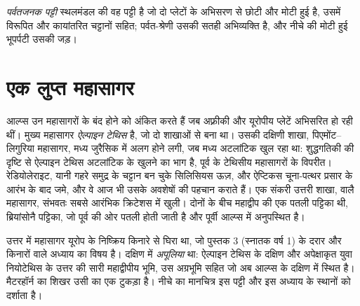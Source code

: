 \begin{definition}[पर्वतजनक पट्टी]\label{def:b2:alpine-orogen:orogen}
\emph{पर्वतजनक पट्टी} स्थलमंडल की वह पट्टी है जो दो प्लेटों के
अभिसरण से छोटी और मोटी हुई है, उसमें विरूपित और कायांतरित चट्टानों सहित; पर्वत-श्रेणी
उसकी सतही अभिव्यक्ति है, और नीचे की मोटी हुई भूपर्पटी उसकी जड़।
\end{definition}

\section{एक लुप्त महासागर}\label{sec:b2:alpine-orogen:tethys}

आल्प्स उन महासागरों के बंद होने को अंकित करते हैं जब अफ़्रीकी और यूरोपीय प्लेटें अभिसरित हो रही थीं।
मुख्य महासागर \emph{ऐल्पाइन टेथिस} है, जो दो शाखाओं से बना था। उसकी दक्षिणी शाखा,
पिएमोंट--लिगुरिया महासागर, मध्य जुरैसिक में अलग होने लगी, जब मध्य अटलांटिक
खुल रहा था: शुद्धगतिकी की दृष्टि से ऐल्पाइन टेथिस अटलांटिक के खुलने का भाग है, पूर्व के
टेथिसीय महासागरों के विपरीत। रेडियोलेराइट, यानी गहरे समुद्र के चट्टान बन चुके सिलिसियस ऊज़,
और ऐप्टिकस चूना-पत्थर प्रसार के आरंभ के बाद जमे, और वे आज भी उसके
अवशेषों की पहचान कराते हैं। एक संकरी उत्तरी शाखा, वालै महासागर, संभवतः सबसे आरंभिक
क्रिटेशस में खुली। दोनों के बीच महाद्वीप की एक पतली पट्टिका थी, ब्रियांसोनै पट्टिका, जो
पूर्व की ओर पतली होती जाती है और पूर्वी आल्प्स में अनुपस्थित है।

उत्तर में महासागर यूरोप के निष्क्रिय किनारे से घिरा था, जो पुस्तक 3 (स्नातक वर्ष 1) के दरार और
किनारों वाले अध्याय का विषय है। दक्षिण में \emph{अपूलिया} था: ऐल्पाइन टेथिस के दक्षिण और
अपेक्षाकृत युवा नियोटेथिस के उत्तर की सारी महाद्वीपीय भूमि, उस अग्रभूमि सहित
जो अब आल्प्स के दक्षिण में स्थित है। मैटरहॉर्न का शिखर उसी का एक टुकड़ा है।
नीचे का मानचित्र इस पट्टी और इस अध्याय के स्थानों को दर्शाता है।

